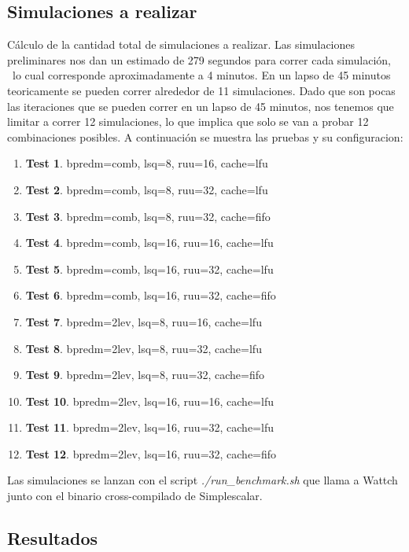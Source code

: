 \documentclass[journal]{IEEEtran}
\begin{document}
\subsection{Simulaciones a realizar}
C\'{a}lculo de la cantidad total de simulaciones a realizar.
Las simulaciones preliminares nos dan un estimado de 279 segundos para correr cada simulaci\'{o}n, \
lo cual corresponde aproximadamente a 4 minutos.  En un lapso de 45 minutos teoricamente se pueden correr alrededor de 11 simulaciones. Dado que son pocas las iteraciones que se pueden correr en un lapso de 45 minutos,
nos tenemos que limitar a correr 12 simulaciones, lo que implica que solo se van a probar 12 combinaciones posibles.
A continuaci\'{o}n se muestra las pruebas y su configuracion: \newline

\begin{enumerate}
\item \textbf{Test 1}.  bpredm=comb, lsq=8, ruu=16, cache=lfu
\item \textbf{Test 2}.  bpredm=comb, lsq=8, ruu=32, cache=lfu
\item \textbf{Test 3}.  bpredm=comb, lsq=8, ruu=32, cache=fifo
\item \textbf{Test 4}.  bpredm=comb, lsq=16, ruu=16, cache=lfu
\item \textbf{Test 5}.  bpredm=comb, lsq=16, ruu=32, cache=lfu
\item \textbf{Test 6}.  bpredm=comb, lsq=16, ruu=32, cache=fifo
\item \textbf{Test 7}.  bpredm=2lev, lsq=8, ruu=16, cache=lfu
\item \textbf{Test 8}.  bpredm=2lev, lsq=8, ruu=32, cache=lfu
\item \textbf{Test 9}.  bpredm=2lev, lsq=8, ruu=32, cache=fifo
\item \textbf{Test 10}. bpredm=2lev, lsq=16, ruu=16, cache=lfu
\item \textbf{Test 11}. bpredm=2lev, lsq=16, ruu=32, cache=lfu
\item \textbf{Test 12}. bpredm=2lev, lsq=16, ruu=32, cache=fifo \newline
\end{enumerate}

Las simulaciones se lanzan con el script \textit{./run\_benchmark.sh} que llama a Wattch junto con el binario cross-compilado de Simplescalar.

\subsection{Resultados}
\end{document}
